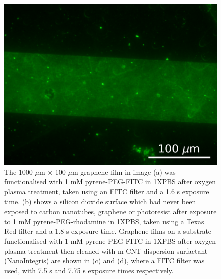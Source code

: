 \documentclass[
  a4paper,
]{scrbook}
\begin{document}
\begin{figure}
\begin{minipage}[t]{0.47\linewidth}
{{\includegraphics{figures/ch6/modified_NGW6D7_PyPEGFITC_channel1_postmsurfclean_7.75sexposure_40X_221123.png}

}

}

\subcaption{\label{fig-PPF-PBS-40X}}
\end{minipage}%

\caption{\label{fig-silicon-dioxide-interaction}The 1000 \(\mu\)m
\(\times\) 100 \(\mu\)m graphene film in image (a) was functionalised
with 1 mM pyrene-PEG-FITC in 1XPBS after oxygen plasma treatment, taken
using an FITC filter and a 1.6 s exposure time. (b) shows a silicon
dioxide surface which had never been exposed to carbon nanotubes,
graphene or photoresist after exposure to 1 mM pyrene-PEG-rhodamine in
1XPBS, taken using a Texas Red filter and a 1.8 s exposure time.
Graphene films on a substrate functionalised with 1 mM pyrene-PEG-FITC
in 1XPBS after oxygen plasma treatment then cleaned with m-CNT
dispersion surfactant (NanoIntegris) are shown in (c) and (d), where a
FITC filter was used, with 7.5 s and 7.75 s exposure times
respectively.}

\end{figure}
\end{document}

